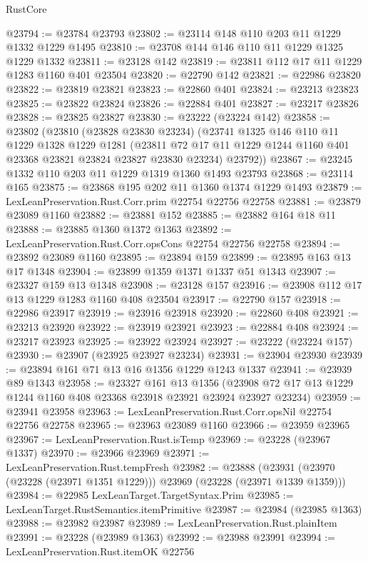 \begin{lexlean}{RustCore}
\begin{coremodule}
@23794 := @23784 @23793
@23802 := @23114 @148 @110 @203 @11 @1229 @1332 @1229 @1495
@23810 := @23708 @144 @146 @110 @11 @1229 @1325 @1229 @1332
@23811 := @23128 @142
@23819 := @23811 @112 @17 @11 @1229 @1283 @1160 @401 @23504
@23820 := @22790 @142
@23821 := @22986 @23820
@23822 := @23819 @23821
@23823 := @22860 @401
@23824 := @23213 @23823
@23825 := @23822 @23824
@23826 := @22884 @401
@23827 := @23217 @23826
@23828 := @23825 @23827
@23830 := @23222 (@23224 @142)
@23858 := @23802
    (@23810
      (@23828 @23830 @23234)
      (@23741
        @1325
        @146
        @110
        @11
        @1229
        @1328
        @1229
        @1281
        (@23811 @72 @17 @11 @1229 @1244 @1160 @401 @23368 @23821 @23824 @23827 @23830 @23234)
        @23792))
@23867 := @23245 @1332 @110 @203 @11 @1229 @1319 @1360 @1493 @23793
@23868 := @23114 @165
@23875 := @23868 @195 @202 @11 @1360 @1374 @1229 @1493
@23879 := LexLeanPreservation.Rust.Corr.prim @22754 @22756 @22758
@23881 := @23879 @23089 @1160
@23882 := @23881 @152
@23885 := @23882 @164 @18 @11
@23888 := @23885 @1360 @1372 @1363
@23892 := LexLeanPreservation.Rust.Corr.opsCons @22754 @22756 @22758
@23894 := @23892 @23089 @1160
@23895 := @23894 @159
@23899 := @23895 @163 @13 @17 @1348
@23904 := @23899 @1359 @1371 @1337 @51 @1343
@23907 := @23327 @159 @13 @1348
@23908 := @23128 @157
@23916 := @23908 @112 @17 @13 @1229 @1283 @1160 @408 @23504
@23917 := @22790 @157
@23918 := @22986 @23917
@23919 := @23916 @23918
@23920 := @22860 @408
@23921 := @23213 @23920
@23922 := @23919 @23921
@23923 := @22884 @408
@23924 := @23217 @23923
@23925 := @23922 @23924
@23927 := @23222 (@23224 @157)
@23930 := @23907 (@23925 @23927 @23234)
@23931 := @23904 @23930
@23939 := @23894 @161 @71 @13 @16 @1356 @1229 @1243 @1337
@23941 := @23939 @89 @1343
@23958 := @23327
    @161
    @13
    @1356
    (@23908 @72 @17 @13 @1229 @1244 @1160 @408 @23368 @23918 @23921 @23924 @23927 @23234)
@23959 := @23941 @23958
@23963 := LexLeanPreservation.Rust.Corr.opsNil @22754 @22756 @22758
@23965 := @23963 @23089 @1160
@23966 := @23959 @23965
@23967 := LexLeanPreservation.Rust.isTemp
@23969 := @23228 (@23967 @1337)
@23970 := @23966 @23969
@23971 := LexLeanPreservation.Rust.tempFresh
@23982 := @23888
    (@23931 (@23970 (@23228 (@23971 @1351 @1229))) @23969 (@23228 (@23971 @1339 @1359)))
@23984 := @22985 LexLeanTarget.TargetSyntax.Prim
@23985 := LexLeanTarget.RustSemantics.itemPrimitive
@23987 := @23984 (@23985 @1363)
@23988 := @23982 @23987
@23989 := LexLeanPreservation.Rust.plainItem
@23991 := @23228 (@23989 @1363)
@23992 := @23988 @23991
@23994 := LexLeanPreservation.Rust.itemOK @22756

\end{coremodule}
\end{lexlean}
